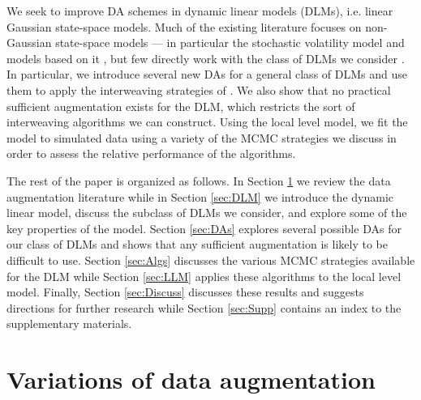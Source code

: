 \documentclass[12pt]{article}
\begin{document}
We seek to improve DA schemes in dynamic linear models (DLMs), i.e. linear Gaussian state-space models. Much of the existing literature focuses on non-Gaussian state-space models --- in particular the stochastic volatility model and models based on it \citep{shephard1996statistical,fruhwirth2003bayesian,roberts2004bayesian,bos2006inference,strickland2008parameterisation,fruhwirth2008heston,kastner2013ancillarity}, but few directly work with the class of DLMs we consider \citep{fruhwirth1994data,carter1994gibbs,fruhwirth2004efficient}. In particular, we introduce several new DAs for a general class of DLMs and use them to apply the interweaving strategies of \citet{yu2011center}. We also show that no practical sufficient augmentation exists for the DLM, which restricts the sort of interweaving algorithms we can construct. Using the local level model, we fit the model to simulated data using a variety of the MCMC strategies we discuss in order to assess the relative performance of the algorithms.

The rest of the paper is organized as follows. In Section \ref{sec:DA} we review the data augmentation literature while in Section \ref{sec:DLM} we introduce the dynamic linear model, discuss the subclass of DLMs we consider, and explore some of the key properties of the model. Section \ref{sec:DAs} explores several possible DAs for our class of DLMs and shows that any sufficient augmentation is likely to be difficult to use. Section \ref{sec:Algs} discusses the various MCMC strategies available for the DLM while Section \ref{sec:LLM} applies these algorithms to the local level model. Finally, Section \ref{sec:Discuss} discusses these results and suggests directions for further research while Section \ref{sec:Supp} contains an index to the supplementary materials.

\section{Variations of data augmentation}\label{sec:DA}
\end{document}
